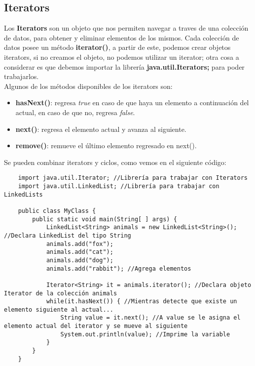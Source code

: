 \subsection{Iterators}
Los \textbf{Iterators} son un objeto que nos permiten navegar a traves de una colección de datos, para obtener y eliminar elementos de los mismos. Cada colección de datos posee un método \textbf{iterator()}, a partir de este, podemos crear objetos iterators, si no creamos el objeto, no podemos utilizar un iterator; otra cosa a considerar es que debemos importar la librería \textbf{java.util.Iterators;} para poder trabajarlos.\\
Algunos de los métodos disponibles de los iterators son:
\begin{itemize}
    \item \textbf{hasNext()}: regresa \textit{true} en caso de que haya un elemento a continuación del actual, en caso de que no, regresa \textit{false}.
    \item \textbf{next()}: regresa el elemento actual y avanza al siguiente.
    \item \textbf{remove()}: remueve el último elemento regresado en next().
\end{itemize}
Se pueden combinar iterators y ciclos, como vemos en el siguiente código:
\begin{lstlisting}
    import java.util.Iterator; //Librería para trabajar con Iterators
    import java.util.LinkedList; //Librería para trabajar con LinkedLists

    public class MyClass {
        public static void main(String[ ] args) {
            LinkedList<String> animals = new LinkedList<String>(); //Declara LinkedList del tipo String
            animals.add("fox");
            animals.add("cat");
            animals.add("dog");
            animals.add("rabbit"); //Agrega elementos
        
            Iterator<String> it = animals.iterator(); //Declara objeto Iterator de la colección animals
            while(it.hasNext()) { //Mientras detecte que existe un elemento siguiente al actual...
                String value = it.next(); //A value se le asigna el elemento actual del iterator y se mueve al siguiente
                System.out.println(value); //Imprime la variable
            }
        }
    }
\end{lstlisting}



